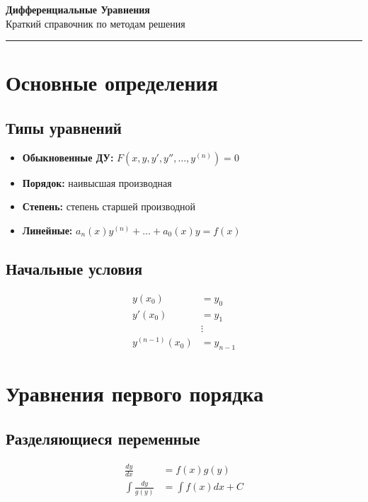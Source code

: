\documentclass[10pt,landscape,a4paper]{article}
\begin{document}
\begin{center}
    {\Huge\bfseries Дифференциальные Уравнения}\\[0.5cm]
    {\large Краткий справочник по методам решения}\\[0.3cm]
    \rule{\textwidth}{1pt}
\end{center}

\begin{multicols}{2}

\section{Основные определения}

\subsection{Типы уравнений}
\begin{itemize}
    \item \textbf{Обыкновенные ДУ:} $F(x, y, y', y'', \ldots, y^{(n)}) = 0$
    \item \textbf{Порядок:} наивысшая производная
    \item \textbf{Степень:} степень старшей производной
    \item \textbf{Линейные:} $a_n(x)y^{(n)} + \ldots + a_0(x)y = f(x)$
\end{itemize}

\subsection{Начальные условия}
\begin{align}
    y(x_0) &= y_0 \\
    y'(x_0) &= y_1 \\
    &\vdots \\
    y^{(n-1)}(x_0) &= y_{n-1}
\end{align}

\section{Уравнения первого порядка}

\subsection{Разделяющиеся переменные}
\begin{align}
    \frac{dy}{dx} &= f(x)g(y) \\
    \int \frac{dy}{g(y)} &= \int f(x) dx + C
\end{align}


\end{multicols}
\end{document}
